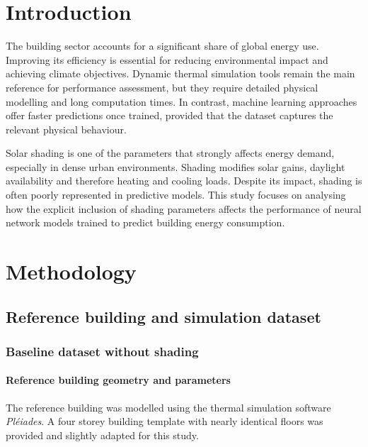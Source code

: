 \documentclass{article}
\begin{document}
\clearpage
\tableofcontents
\clearpage

\twocolumn

\section{Introduction}
The building sector accounts for a significant share of global energy use. Improving its efficiency is essential for reducing environmental impact and achieving climate objectives. Dynamic thermal simulation tools remain the main reference for performance assessment, but they require detailed physical modelling and long computation times. In contrast, machine learning approaches offer faster predictions once trained, provided that the dataset captures the relevant physical behaviour.

Solar shading is one of the parameters that strongly affects energy demand, especially in dense urban environments. Shading modifies solar gains, daylight availability and therefore heating and cooling loads. Despite its impact, shading is often poorly represented in predictive models. This study focuses on analysing how the explicit inclusion of shading parameters affects the performance of neural network models trained to predict building energy consumption.

\section{Methodology}
\subsection{Reference building and simulation dataset}
\subsubsection{Baseline dataset without shading}

\paragraph{Reference building geometry and parameters}

The reference building was modelled using the thermal simulation software \textit{Pléiades}. A four storey building template with nearly identical floors was provided and slightly adapted for this study.
\end{document}
